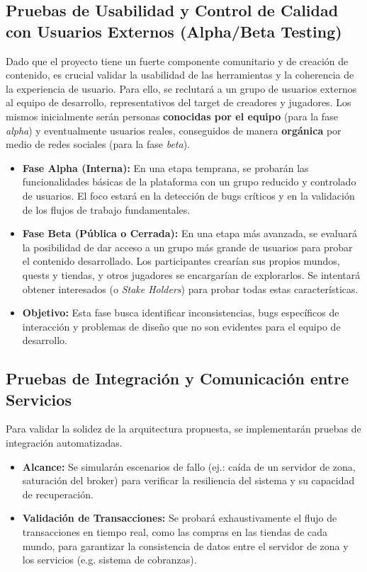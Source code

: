 \subsection{Pruebas de Usabilidad y Control de Calidad con Usuarios Externos (Alpha/Beta Testing)}

Dado que el proyecto tiene un fuerte componente comunitario y de creación de contenido, es crucial validar la usabilidad de las herramientas y la coherencia 
de la experiencia de usuario. Para ello, se reclutará a un grupo de usuarios externos al equipo de desarrollo, representativos del target de creadores y jugadores. Los mismos
inicialmente serán personas \textbf{conocidas por el equipo} (para la fase \textit{alpha}) y eventualmente usuarios reales, conseguidos de manera \textbf{orgánica} por medio de redes sociales
(para la fase \textit{beta}).

\begin{itemize}
    \item \textbf{Fase Alpha (Interna):} En una etapa temprana, se probarán las funcionalidades básicas de la plataforma con un grupo reducido y controlado de usuarios.
    El foco estará en la detección de bugs críticos y en la validación de los flujos de trabajo fundamentales.
    \item \textbf{Fase Beta (Pública o Cerrada):} En una etapa más avanzada, se evaluará la posibilidad de dar acceso a un grupo más grande de usuarios para probar el contenido desarrollado.
    Los participantes crearían sus propios mundos, quests y tiendas, y otros jugadores se encargarían de explorarlos. 
    Se intentará obtener interesados (o \textit{Stake Holders}) para probar todas estas características.
    \item \textbf{Objetivo:} Esta fase busca identificar inconsistencias, bugs específicos de interacción y problemas de diseño que no son evidentes para el equipo de desarrollo.
\end{itemize}


\subsection{Pruebas de Integración y Comunicación entre Servicios}

Para validar la solidez de la arquitectura propuesta, se implementarán pruebas de integración automatizadas.

\begin{itemize}
    \item \textbf{Alcance:} Se simularán escenarios de fallo (ej.: caída de un servidor de zona, saturación del broker) para verificar la resiliencia del sistema 
    y su capacidad de recuperación.
    \item \textbf{Validación de Transacciones:} Se probará exhaustivamente el flujo de transacciones en tiempo real, 
    como las compras en las tiendas de cada mundo, para garantizar la consistencia de datos entre el servidor 
    de zona y los servicios (e.g. sistema de cobranzas).
\end{itemize}

